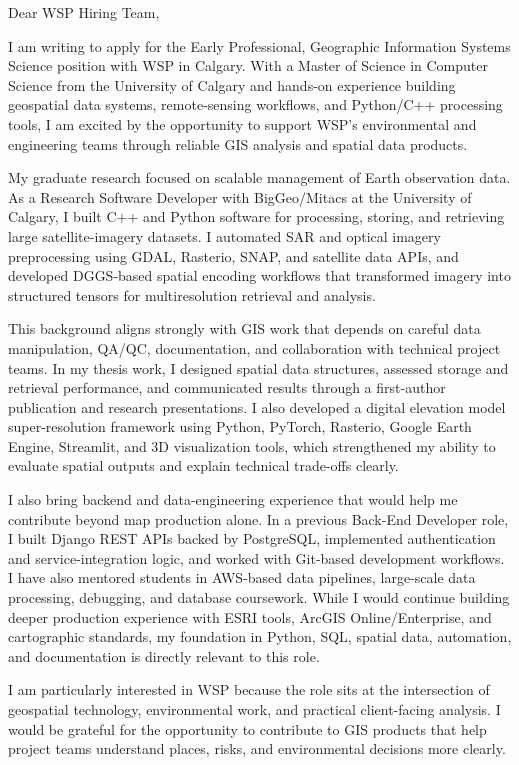 \documentclass[11pt]{letter}
\begin{document}
\begin{letter}{}

\opening{Dear WSP Hiring Team,}

I am writing to apply for the Early Professional, Geographic Information Systems Science position with WSP in Calgary. With a Master of Science in Computer Science from the University of Calgary and hands-on experience building geospatial data systems, remote-sensing workflows, and Python/C++ processing tools, I am excited by the opportunity to support WSP's environmental and engineering teams through reliable GIS analysis and spatial data products.

My graduate research focused on scalable management of Earth observation data. As a Research Software Developer with BigGeo/Mitacs at the University of Calgary, I built C++ and Python software for processing, storing, and retrieving large satellite-imagery datasets. I automated SAR and optical imagery preprocessing using GDAL, Rasterio, SNAP, and satellite data APIs, and developed DGGS-based spatial encoding workflows that transformed imagery into structured tensors for multiresolution retrieval and analysis.

This background aligns strongly with GIS work that depends on careful data manipulation, QA/QC, documentation, and collaboration with technical project teams. In my thesis work, I designed spatial data structures, assessed storage and retrieval performance, and communicated results through a first-author publication and research presentations. I also developed a digital elevation model super-resolution framework using Python, PyTorch, Rasterio, Google Earth Engine, Streamlit, and 3D visualization tools, which strengthened my ability to evaluate spatial outputs and explain technical trade-offs clearly.

I also bring backend and data-engineering experience that would help me contribute beyond map production alone. In a previous Back-End Developer role, I built Django REST APIs backed by PostgreSQL, implemented authentication and service-integration logic, and worked with Git-based development workflows. I have also mentored students in AWS-based data pipelines, large-scale data processing, debugging, and database coursework. While I would continue building deeper production experience with ESRI tools, ArcGIS Online/Enterprise, and cartographic standards, my foundation in Python, SQL, spatial data, automation, and documentation is directly relevant to this role.

I am particularly interested in WSP because the role sits at the intersection of geospatial technology, environmental work, and practical client-facing analysis. I would be grateful for the opportunity to contribute to GIS products that help project teams understand places, risks, and environmental decisions more clearly.


\end{letter}
\end{document}
